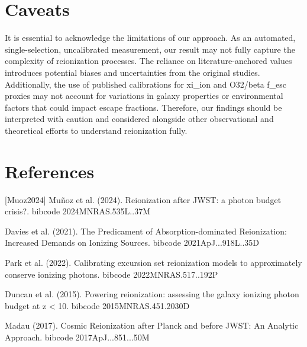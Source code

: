 \documentclass[twocolumn]{aastex631}
\begin{document}
\section{Caveats}
It is essential to acknowledge the limitations of our approach. As an automated, single-selection, uncalibrated measurement, our result may not fully capture the complexity of reionization processes. The reliance on literature-anchored values introduces potential biases and uncertainties from the original studies. Additionally, the use of published calibrations for xi\_ion and O32/beta f\_esc proxies may not account for variations in galaxy properties or environmental factors that could impact escape fractions. Therefore, our findings should be interpreted with caution and considered alongside other observational and theoretical efforts to understand reionization fully.
\section*{References}
\footnotesize
[Muoz2024] Muñoz et al. (2024). Reionization after JWST: a photon budget crisis?. bibcode 2024MNRAS.535L..37M \par [Davies2021] Davies et al. (2021). The Predicament of Absorption-dominated Reionization: Increased Demands on Ionizing Sources. bibcode 2021ApJ...918L..35D \par [Park2022] Park et al. (2022). Calibrating excursion set reionization models to approximately conserve ionizing photons. bibcode 2022MNRAS.517..192P \par [Duncan2015] Duncan et al. (2015). Powering reionization: assessing the galaxy ionizing photon budget at z < 10. bibcode 2015MNRAS.451.2030D \par [Madau2017] Madau (2017). Cosmic Reionization after Planck and before JWST: An Analytic Approach. bibcode 2017ApJ...851...50M
\end{document}
